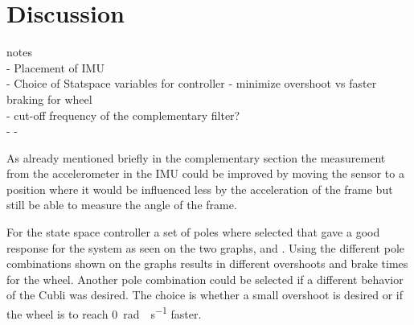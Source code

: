 \chapter{Discussion}

{\Large notes} \\
- Placement of IMU\\
- Choice of Statspace variables for controller - minimize overshoot vs faster braking for wheel\\
- cut-off frequency of the complementary filter?\\
- 
- 


As already mentioned briefly in the complementary section the measurement from the accelerometer in the IMU could be improved by moving the sensor to a position where it would be influenced less by the acceleration of the frame but still be able to measure the angle of the frame. 

For the state space controller a set of poles where selected that gave a good response for the system as seen on the two graphs,  and . Using the different pole combinations shown on the graphs results in different overshoots and brake times for the wheel. Another pole combination could be selected if a different behavior of the Cubli was desired. The choice is whether a small overshoot is desired or if the wheel is to reach \SI{0}{rad\cdot s^{-1}} faster.

